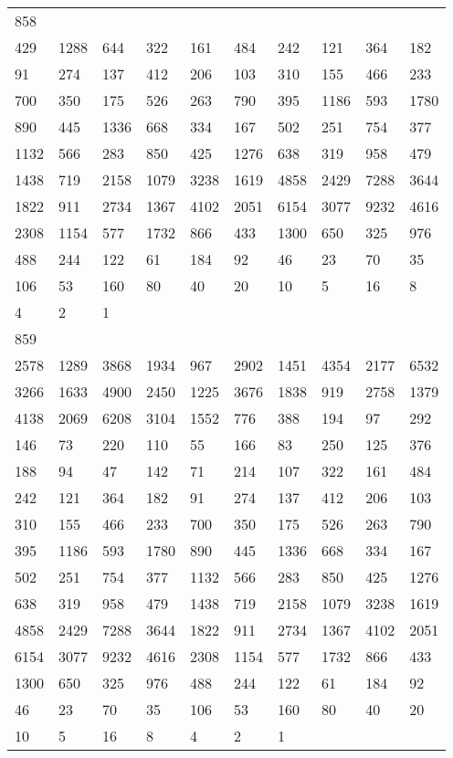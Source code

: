 \begin{longtable}{*{10}{l}}
858&&&&&&&&&\\
429& 1288& 644& 322& 161& 484& 242& 121& 364& 182\\
91& 274& 137& 412& 206& 103& 310& 155& 466& 233\\
700& 350& 175& 526& 263& 790& 395& 1186& 593& 1780\\
890& 445& 1336& 668& 334& 167& 502& 251& 754& 377\\
1132& 566& 283& 850& 425& 1276& 638& 319& 958& 479\\
1438& 719& 2158& 1079& 3238& 1619& 4858& 2429& 7288& 3644\\
1822& 911& 2734& 1367& 4102& 2051& 6154& 3077& 9232& 4616\\
2308& 1154& 577& 1732& 866& 433& 1300& 650& 325& 976\\
488& 244& 122& 61& 184& 92& 46& 23& 70& 35\\
106& 53& 160& 80& 40& 20& 10& 5& 16& 8\\
4& 2& 1& \\

859&&&&&&&&&\\
2578& 1289& 3868& 1934& 967& 2902& 1451& 4354& 2177& 6532\\
3266& 1633& 4900& 2450& 1225& 3676& 1838& 919& 2758& 1379\\
4138& 2069& 6208& 3104& 1552& 776& 388& 194& 97& 292\\
146& 73& 220& 110& 55& 166& 83& 250& 125& 376\\
188& 94& 47& 142& 71& 214& 107& 322& 161& 484\\
242& 121& 364& 182& 91& 274& 137& 412& 206& 103\\
310& 155& 466& 233& 700& 350& 175& 526& 263& 790\\
395& 1186& 593& 1780& 890& 445& 1336& 668& 334& 167\\
502& 251& 754& 377& 1132& 566& 283& 850& 425& 1276\\
638& 319& 958& 479& 1438& 719& 2158& 1079& 3238& 1619\\
4858& 2429& 7288& 3644& 1822& 911& 2734& 1367& 4102& 2051\\
6154& 3077& 9232& 4616& 2308& 1154& 577& 1732& 866& 433\\
1300& 650& 325& 976& 488& 244& 122& 61& 184& 92\\
46& 23& 70& 35& 106& 53& 160& 80& 40& 20\\
10& 5& 16& 8& 4& 2& 1& \\


\end{longtable}
